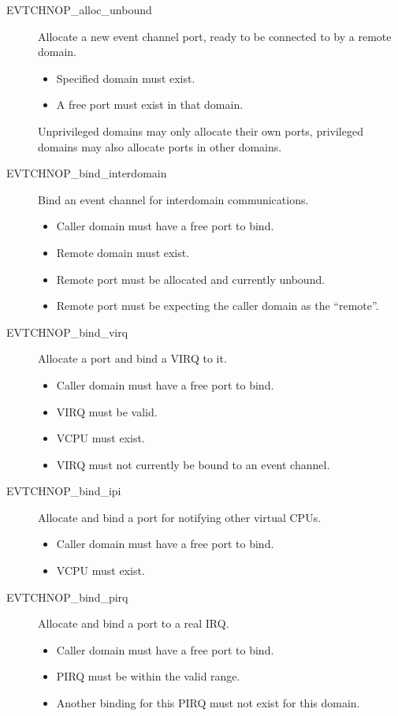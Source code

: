 \documentclass[11pt,twoside,final,openright,a4paper]{report}
\begin{document}
\begin{description}

\item[EVTCHNOP\_alloc\_unbound]
  Allocate a new event channel port, ready to be connected to by a
  remote domain.
  \begin{itemize}
  \item Specified domain must exist.
  \item A free port must exist in that domain.
  \end{itemize}
  Unprivileged domains may only allocate their own ports, privileged
  domains may also allocate ports in other domains.
\item[EVTCHNOP\_bind\_interdomain]
  Bind an event channel for interdomain communications.
  \begin{itemize}
  \item Caller domain must have a free port to bind.
  \item Remote domain must exist.
  \item Remote port must be allocated and currently unbound.
  \item Remote port must be expecting the caller domain as the ``remote''.
  \end{itemize}
\item[EVTCHNOP\_bind\_virq]
  Allocate a port and bind a VIRQ to it.
  \begin{itemize}
  \item Caller domain must have a free port to bind.
  \item VIRQ must be valid.
  \item VCPU must exist.
  \item VIRQ must not currently be bound to an event channel.
  \end{itemize}
\item[EVTCHNOP\_bind\_ipi]
  Allocate and bind a port for notifying other virtual CPUs.
  \begin{itemize}
  \item Caller domain must have a free port to bind.
  \item VCPU must exist.
  \end{itemize}
\item[EVTCHNOP\_bind\_pirq]
  Allocate and bind a port to a real IRQ.
  \begin{itemize}
  \item Caller domain must have a free port to bind.
  \item PIRQ must be within the valid range.
  \item Another binding for this PIRQ must not exist for this domain.

\end{itemize}
\end{description}
\end{document}

